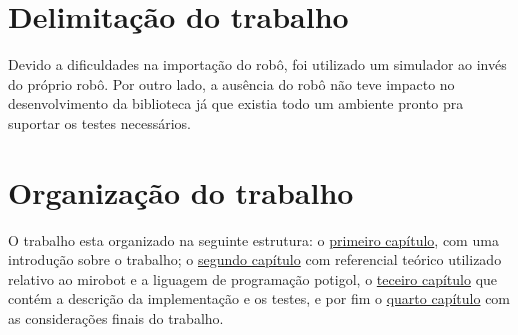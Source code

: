 \section{Delimitação do trabalho}

Devido a dificuldades na importação do robô, foi utilizado um simulador ao
invés do próprio robô. Por outro lado, a ausência do robô não teve 
impacto no desenvolvimento da biblioteca já que existia todo um ambiente pronto
pra suportar os testes necessários.


\section{Organização do trabalho}

O trabalho esta organizado na seguinte estrutura: o
\hyperref[cap:introducao]{primeiro capítulo}, com uma introdução sobre o
trabalho; o \hyperref[cap:referencial]{segundo capítulo} com referencial
teórico utilizado relativo ao mirobot e a liguagem de programação potigol, o
\hyperref[cap:descricao]{teceiro capítulo} que contém a descrição da
implementação e os testes, e por fim o \hyperref[cap:consideracoes]{quarto
capítulo} com as considerações finais do trabalho.
